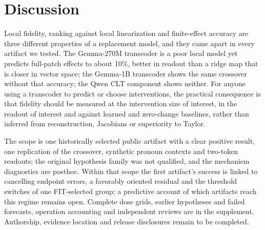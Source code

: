 \documentclass[11pt]{article}
\begin{document}
\section{Discussion}
Local fidelity, ranking against local linearization and finite-effect accuracy are three different properties of a replacement model, and they came apart in every artifact we tested. The Gemma-270M transcoder is a poor local model yet predicts full-patch effects to about 10\%, better in readout than a ridge map that is closer in vector space; the Gemma-1B transcoder shows the same crossover without that accuracy; the Qwen CLT component shows neither. For anyone using a transcoder to predict or choose interventions, the practical consequence is that fidelity should be measured at the intervention size of interest, in the readout of interest and against learned and zero-change baselines, rather than inferred from reconstruction, Jacobians or superiority to Taylor.

The scope is one historically selected public artifact with a clear positive result, one replication of the crossover, synthetic pronoun contexts and two-token readouts; the original hypothesis family was not qualified, and the mechanism diagnostics are posthoc. Within that scope the first artifact's success is linked to cancelling endpoint errors, a favorably oriented residual and the threshold switches of one FIT-selected group; a predictive account of which artifacts reach this regime remains open. Complete dose grids, earlier hypotheses and failed forecasts, operation accounting and independent reviews are in the supplement. Authorship, evidence location and release disclosures remain to be completed.

\clearpage
\small


\end{document}
